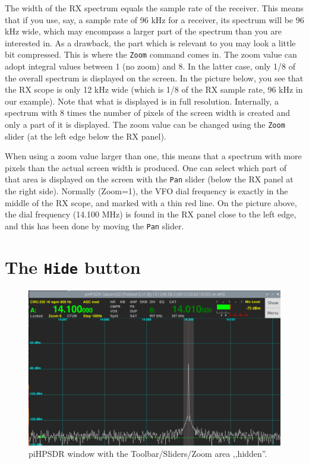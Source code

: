 \documentclass[12pt]{book}
\def\rett#1{\texttt{\color{red}#1}}
\def\bltt#1{\texttt{\color{blue}#1}}
\begin{document}
The width of the RX spectrum equals the sample rate
of the receiver. This means that if you use, say,
a sample rate of 96 kHz for a receiver, its spectrum
will be 96 kHz wide, which may encompass a larger part
of the spectrum than you are interested in. As a drawback,
the part which is relevant to you may look a little bit
compressed. This is where the \bltt{Zoom} command
comes in. The zoom value can adopt integral values between
1 (no zoom) and 8. In the latter case, only 1/8 of the
overall spectrum is displayed on the screen. In the
picture below, you see that the RX scope is only 12 kHz
wide (which is 1/8 of the RX sample rate, 96 kHz in our
example). Note that what is displayed is in full resolution.
Internally, a spectrum with 8 times the number of pixels
of the screen width is created and only a part of it is
displayed. The zoom value can be changed using the \rett{Zoom}
slider (at the left edge below the RX panel).


When using a zoom value larger than one, this means that
a spectrum with more pixels than the actual screen width
is produced. One can select which part of that area
is displayed on the screen with the \rett{Pan} slider
(below the RX panel at the right side). Normally (Zoom=1),
the VFO dial frequency is exactly in the middle of the
RX scope, and marked with a thin red line. On the picture
above, the dial frequency (14.100 MHz) is found in the RX
panel close to the left edge, and this has been done
by moving the \rett{Pan} slider.

\section{The \texttt{Hide} button}
\begin{figure}[h]
\center
\includegraphics[width=12cm]{Hidden.png}
\caption{piHPSDR window with the Toolbar/Sliders/Zoom
area ,,hidden''.}
\end{figure}
\end{document}
